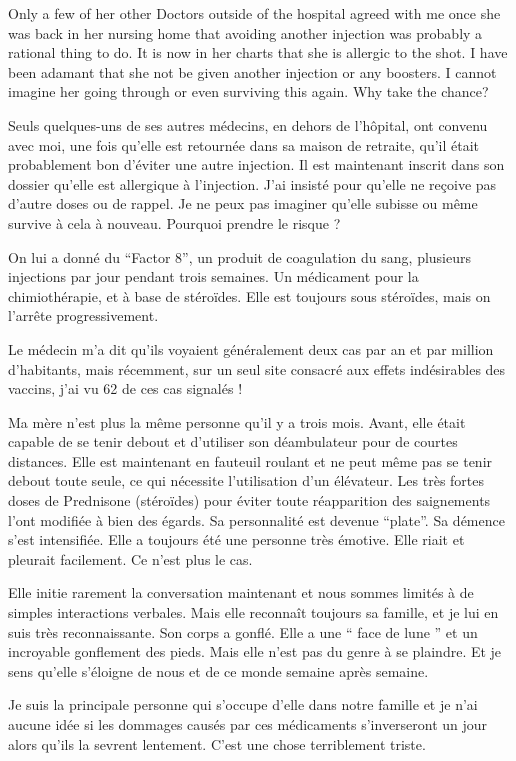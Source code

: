 {Only a few of her other Doctors outside of the hospital agreed with me once she
was back in her nursing home that avoiding another injection was probably a
rational thing to do. It is now in her charts that she is allergic to the
shot. I have been adamant that she not be given another injection or any
boosters. I cannot imagine her going through or even surviving this again. Why
take the chance?

Seuls quelques-uns de ses autres médecins, en dehors de l'hôpital, ont convenu
avec moi, une fois qu'elle est retournée dans sa maison de retraite, qu'il était
probablement bon d'éviter une autre injection. Il est maintenant inscrit dans
son dossier qu'elle est allergique à l'injection. J'ai insisté pour qu'elle ne
reçoive pas d'autre doses ou de rappel. Je ne peux pas imaginer qu'elle subisse
ou même survive à cela à nouveau. Pourquoi prendre le risque ?

On lui a donné du “Factor 8”, un produit de coagulation du sang, plusieurs
injections par jour pendant trois semaines. Un médicament pour la
chimiothérapie, et à base de stéroïdes. Elle est toujours sous stéroïdes, mais
on l'arrête progressivement.

Le médecin m'a dit qu'ils voyaient généralement deux cas par an et par million
d'habitants, mais récemment, sur un seul site consacré aux effets indésirables
des vaccins, j'ai vu 62 de ces cas signalés !

Ma mère n'est plus la même personne qu'il y a trois mois. Avant, elle était
capable de se tenir debout et d'utiliser son déambulateur pour de courtes
distances. Elle est maintenant en fauteuil roulant et ne peut même pas se tenir
debout toute seule, ce qui nécessite l'utilisation d'un élévateur. Les très
fortes doses de Prednisone (stéroïdes) pour éviter toute réapparition des
saignements l'ont modifiée à bien des égards. Sa personnalité est devenue
“plate”. Sa démence s'est intensifiée. Elle a toujours été une personne très
émotive. Elle riait et pleurait facilement. Ce n'est plus le cas.

Elle initie rarement la conversation maintenant et nous sommes limités à de
simples interactions verbales. Mais elle reconnaît toujours sa famille, et je
lui en suis très reconnaissante. Son corps a gonflé. Elle a une “ face de lune ”
et un incroyable gonflement des pieds. Mais elle n'est pas du genre à se
plaindre. Et je sens qu'elle s'éloigne de nous et de ce monde semaine après
semaine.

Je suis la principale personne qui s'occupe d'elle dans notre famille et je n'ai
aucune idée si les dommages causés par ces médicaments s'inverseront un jour
alors qu'ils la sevrent lentement. C'est une chose terriblement triste.

}

